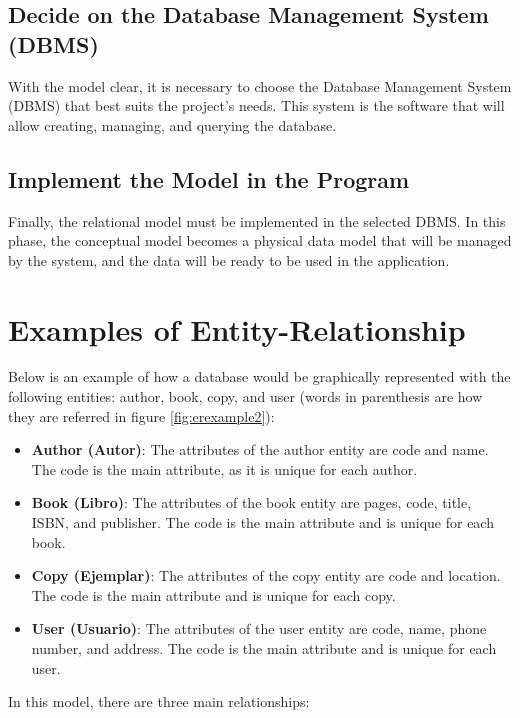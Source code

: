 \documentclass{article}
\begin{document}
\subsection{Decide on the Database Management System (DBMS)}

With the model clear, it is necessary to choose the Database Management System (DBMS) that best suits the project's needs. This system is the software that will allow creating, managing, and querying the database.

\subsection{Implement the Model in the Program}

Finally, the relational model must be implemented in the selected DBMS. In this phase, the conceptual model becomes a physical data model that will be managed by the system, and the data will be ready to be used in the application.

\section{Examples of Entity-Relationship} \label{sec:example}

Below is an example of how a database would be graphically represented with the following entities: author, book, copy, and user (words in parenthesis are how they are referred in figure \ref{fig:erexample2}):

\begin{itemize}
    \item \textbf{Author (Autor)}: The attributes of the author entity are code and name. The code is the main attribute, as it is unique for each author.
    \item \textbf{Book (Libro)}: The attributes of the book entity are pages, code, title, ISBN, and publisher. The code is the main attribute and is unique for each book.
    \item \textbf{Copy (Ejemplar)}: The attributes of the copy entity are code and location. The code is the main attribute and is unique for each copy.
    \item \textbf{User (Usuario)}: The attributes of the user entity are code, name, phone number, and address. The code is the main attribute and is unique for each user.
\end{itemize}

In this model, there are three main relationships:
\end{document}

